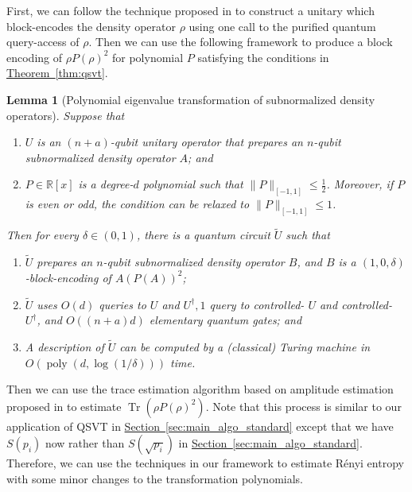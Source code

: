 \documentclass[journal]{IEEEtran}
\newtheorem{lemma}{Lemma}
\newcommand{\thm}[1]{\hyperref[thm:#1]{Theorem~\ref*{thm:#1}}}
\renewcommand{\sec}[1]{\hyperref[sec:#1]{Section~\ref*{sec:#1}}}
\def\Tr{\operatorname{Tr}}\def\atanh{\operatorname{atanh}}\def\:{\hbox{\bf:}}
\begin{document}
First, we can follow the technique proposed in \cite{low2019hamiltonian} to construct a unitary which block-encodes the density operator $\rho$ using one call to the purified quantum query-access of $\rho$. Then we can use the following framework to produce a block encoding of $\rho P(\rho)^2$ for polynomial $P$ satisfying the conditions in \thm{qsvt}. 
\begin{lemma}[Polynomial eigenvalue transformation of subnormalized density operators{}]Suppose that 
\begin{enumerate}
    \item $U$ is an $(n+a)$-qubit unitary operator that prepares an $n$-qubit subnormalized density operator $A$; and
    \item $P \in \mathbb{R}[x]$ is a degree-$d$ polynomial such that $\|P\|_{[-1,1]} \leq \frac{1}{2}$. Moreover, if $P$ is even or odd, the condition can be relaxed to $\|P\|_{[-1,1]} \leq 1$.
\end{enumerate}
Then for every $\delta \in(0,1)$, there is a quantum circuit $\tilde{U}$ such that
\begin{enumerate}
    \item $\tilde{U}$ prepares an $n$-qubit subnormalized density operator $B$, and $B$ is a $(1,0, \delta)$-block-encoding of $A(P(A))^{2}$;
    \item $\tilde{U}$ uses $O(d)$ queries to $U$ and $U^{\dagger}, 1$ query to controlled- $U$ and controlled- $U^{\dagger}$, and $O((n+a) d)$ elementary quantum gates; and
    \item A description of $\tilde{U}$ can be computed by a (classical) Turing machine in $O(\operatorname{poly}(d, \log (1 / \delta)))$ time.
\end{enumerate}
\end{lemma}
Then we can use the trace estimation algorithm based on amplitude estimation proposed in \cite{wang2022new} to estimate $\Tr(\rho P(\rho)^2)$. 
\fi
Note that this process is similar to our application of QSVT in \sec{main_algo_standard} except that we have $S(p_i)$ now rather than $S(\sqrt{p_i})$ in \sec{main_algo_standard}.  Therefore, we can use the techniques in our framework to estimate R{\'e}nyi entropy with some minor changes to the transformation polynomials. 
\end{document}
